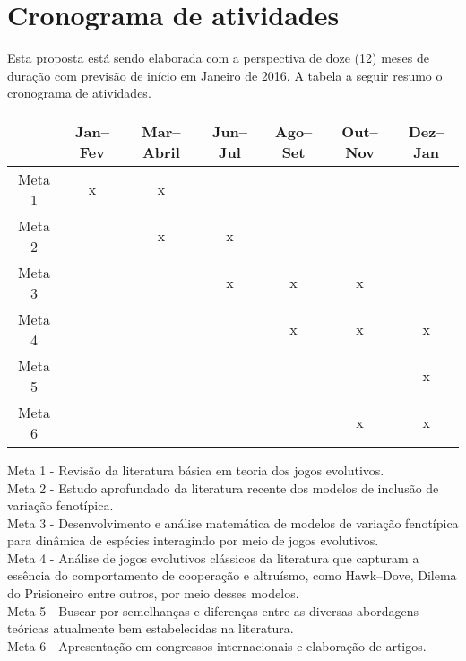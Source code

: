 \documentclass[
	12pt,				%
	openany,			%
	oneoside,			%
	a4paper,			%
	english,			%
	spanish,			%
	brazil,				%
	]{abntex2}
\begin{document}
\chapter{Cronograma de atividades}
Esta proposta está sendo elaborada com a perspectiva de doze (12) meses de duração com previsão de início em Janeiro de 2016. A tabela a seguir resumo o cronograma de atividades.
\begin{center}
\begin{table}[h]
\begin{tabular}{|c||c|c|c|c|c|c|}
\hline
&Jan--Fev&Mar--Abril&Jun--Jul&Ago--Set&Out--Nov&Dez--Jan\\
\hline
Meta 1&x&x&&&&\\
\hline
Meta 2&&x&x&&&\\
\hline
Meta 3&&&x&x&x&\\
\hline
Meta 4&&&&x&x&x\\
\hline
Meta 5&&&&&&x\\
\hline
Meta 6&&&&&x&x\\
\hline
\end{tabular}
\end{table}
\end{center}
Meta 1 - Revisão da literatura básica em teoria dos jogos evolutivos.\\
Meta 2 - Estudo aprofundado da literatura recente dos modelos de inclusão de variação fenotípica.\\
Meta 3 - Desenvolvimento e análise matemática de modelos de variação fenotípica para dinâmica de espécies interagindo por meio de jogos evolutivos.\\
Meta 4 - Análise de jogos evolutivos clássicos da literatura que capturam a essência do comportamento de cooperação e altruísmo, como Hawk--Dove, Dilema do Prisioneiro entre outros,  por meio desses modelos.\\
Meta 5 - Buscar por semelhanças e diferenças entre as diversas abordagens teóricas atualmente bem estabelecidas na literatura.\\
Meta 6 - Apresentação em congressos internacionais e elaboração de artigos.\\



%

\end{document}
